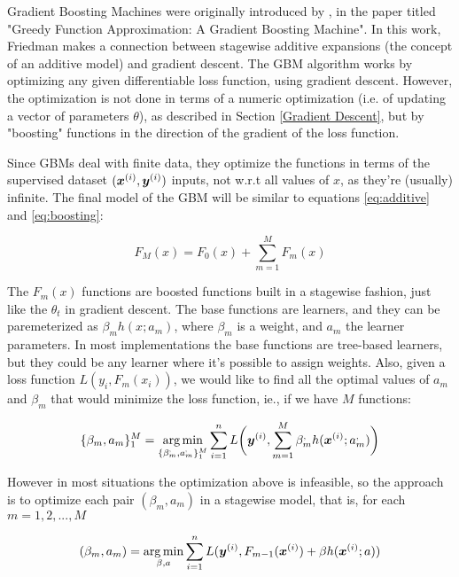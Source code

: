 Gradient Boosting Machines were originally introduced by \cite{gbmdef}, in the paper titled "Greedy Function Approximation: A Gradient Boosting Machine". In this work, Friedman makes a connection between stagewise additive expansions (the concept of an additive model) and gradient descent. The GBM algorithm works by optimizing any given differentiable loss function, using gradient descent. However, the optimization is not done in terms of a numeric optimization (i.e. of updating a vector of parameters $\theta$), as described in Section \ref{Gradient Descent}, but by "boosting" functions in the direction of the gradient of the loss function.

Since GBMs deal with finite data, they optimize the functions in terms of the supervised dataset $(\bm{x}^{(i)},\bm{y}^{(i)})$ inputs, not w.r.t all values of $x$, as they're (usually) infinite. The final model of the GBM will be similar to equations \ref{eq:additive} and \ref{eq:boosting}:

\begin{equation}\label{eq:gbm-1}
    F_M(x) = F_0(x) + \sum_{m=1}^M F_m(x)
\end{equation}

The $F_m(x)$ functions are boosted functions built in a stagewise fashion, just like the $\theta_t$ in gradient descent. The base functions are learners, and they can be paremeterized as $\beta_mh(x;a_m)$, where $\beta_m$ is a weight, and $a_m$ the learner parameters. In most implementations the base functions are tree-based learners, but they could be any learner where it's possible to assign weights. Also, given a loss function $L(y_i, F_m(x_i))$, we would like to find all the optimal values of $a_m$ and $\beta_m$ that would minimize the loss function, ie., if we have $M$ functions:

\begin{equation*}
\{\beta_m, a_m\}_1^M = \argmin_{\{\beta_m^\apsimple, a_m^\apsimple\}_1^M} \sum_{i=1}^n L\bigg(\yisup, \sum_{m=1}^M \beta_m^\apsimple h(\xisup;a_m^\apsimple)\bigg)
\end{equation*}

However in most situations the optimization above is infeasible, so the  approach is to optimize each pair $(\beta_m, a_m)$ in a stagewise model, that is, for each $m = 1, 2, ..., M$

\begin{equation*}
    (\beta_m, a_m) = \operatorname*{arg\,min}_{\beta, a} \sum_{i=1}^n L(\bm{y}^{(i)}, F_{m-1}(\bm{x}^{(i)}) + \beta h(\bm{x}^{(i)}; a))
\end{equation*}

